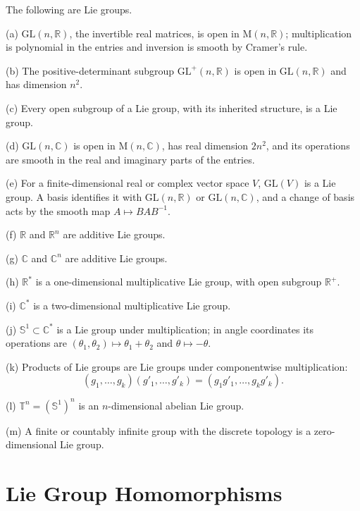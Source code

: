 \begin{example}
\label{ex:7-3}



The following are Lie groups.

(a) $\mathrm{GL}(n,\mathbb R)$, the invertible real matrices, is open in
$\mathrm M(n,\mathbb R)$; multiplication is polynomial in the entries and
inversion is smooth by Cramer's rule.

(b) The positive-determinant subgroup $\mathrm{GL}^{+}(n,\mathbb R)$ is open
in $\mathrm{GL}(n,\mathbb R)$ and has dimension $n^2$.

(c) Every open subgroup of a Lie group, with its inherited structure, is a Lie
group.

(d) $\mathrm{GL}(n,\mathbb C)$ is open in $\mathrm M(n,\mathbb C)$, has real
dimension $2n^2$, and its operations are smooth in the real and imaginary
parts of the entries.

(e) For a finite-dimensional real or complex vector space $V$,
$\mathrm{GL}(V)$ is a Lie group. A basis identifies it with
$\mathrm{GL}(n,\mathbb R)$ or $\mathrm{GL}(n,\mathbb C)$, and a change of
basis acts by the smooth map $A\mapsto BAB^{-1}$.

(f) $\mathbb R$ and $\mathbb R^n$ are additive Lie groups.

(g) $\mathbb C$ and $\mathbb C^n$ are additive Lie groups.

(h) $\mathbb R^{*}$ is a one-dimensional multiplicative Lie group, with open
subgroup $\mathbb R^{+}$.

(i) $\mathbb C^{*}$ is a two-dimensional multiplicative Lie group.

(j) $\mathbb S^1\subset\mathbb C^{*}$ is a Lie group under multiplication; in
angle coordinates its operations are
$(\theta_1,\theta_2)\mapsto\theta_1+\theta_2$ and $\theta\mapsto-\theta$.

(k) Products of Lie groups are Lie groups under componentwise multiplication:
\[
(g_1,\ldots,g_k)(g'_1,\ldots,g'_k)
=(g_1g'_1,\ldots,g_kg'_k).
\]

(l) $\mathbb T^n=(\mathbb S^1)^n$ is an $n$-dimensional abelian Lie group.

(m) A finite or countably infinite group with the discrete topology is a
zero-dimensional Lie group.
\end{example}

\section{Lie Group Homomorphisms}


